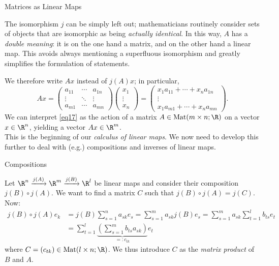 \documentclass[smaller,hyperref={CJKbookmarks=true}]{beamer}
\begin{document}
\begin{frame}{Matrices as Linear Maps}
\begin{spacing}{1}
The isomorphism $j$ can be simply left out; mathematicians routinely consider sets of objects that are isomorphic as being \emph{actually identical}. In this way, $A$ has a \emph{double meaning}: it is on the one hand a matrix, and on the other hand a linear map. This avoids always mentioning a superfluous isomorphism and greatly simplifies the formulation of statements.
\end{spacing}
\newpage
\begin{spacing}{1.2}
We therefore write $Ax$ instead of $j(A)x$; in particular,
\setcounter{equation}{0}
\begin{equation}\label{eq17}
  Ax=\begin{pmatrix}
       a_{11} & \cdots & a_{1n} \\
       \vdots & \ddots & \vdots \\
       a_{m1} & \cdots & a_{mn}
     \end{pmatrix}\begin{pmatrix}
                    x_1 \\
                    \vdots \\
                    x_n
                  \end{pmatrix}=\begin{pmatrix}
                                  x_1a_{11}+\cdots+x_na_{1n} \\
                                  \vdots \\
                                  x_1a_{m1}+\cdots+x_na_{mn}
                                \end{pmatrix}.
\end{equation}
We can interpret \eqref{eq17} as the action of a matrix $A\in\text{Mat}(m\times n;\R)$ on a vector $x\in\R^n$, yielding a vector $Ax\in\R^m$.\\[12pt]
This is the beginning of our \emph{calculus of linear maps}. We now need to develop this further to deal with (e.g.) compositions and inverses of linear
maps.
\end{spacing}
\end{frame}
\begin{frame}[c]{Compositions}
\begin{spacing}{1.2}
Let $\R^n\xrightarrow[]{j(A)}\R^m\xrightarrow[]{j(B)}\R^l$ be linear maps and consider their composition $j(B)\circ j(A)$. We want to find a matrix $C$ such that $j(B)\circ j(A)=j(C)$. Now:
\begin{equation*}
  \begin{split}
     j(B)\circ j(A)e_k &=j(B)\sum_{s=1}^{n}a_{sk}e_s=\sum_{s=1}^{m}a_{sk}j(B)e_s=\sum_{s=1}^{m}a_{sk}\sum_{t=1}^{l}b_{ts}e_t \\
     &=\sum_{t=1}^{l}\underbrace{\left(\sum_{s=1}^{m}b_{ts}a_{sk}\right)}_{=:c_{tk}}e_t
  \end{split}
\end{equation*}
where $C=(c_{tk})\in\text{Mat}(l\times n;\R)$. We thus introduce $C$ as the \emph{matrix product} of $B$ and $A$.
\end{spacing}
\end{frame}
\end{document}
